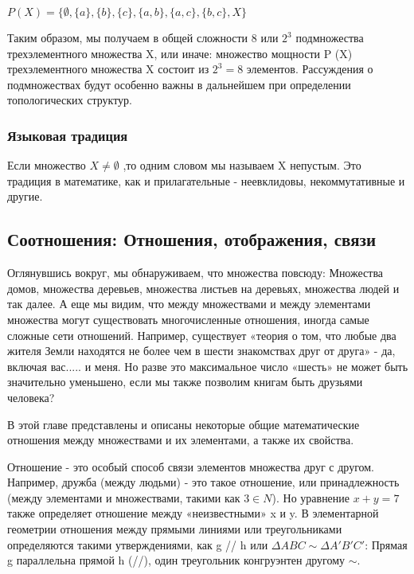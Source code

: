 \vspace{0.5cm}
\(P(X)=\{\emptyset, \{a\}, \{b\},\{c\},\{a,b\},\{a,c\},\{b,c\}, X\}\)

\vspace{0.5cm}

Таким образом, мы получаем в общей сложности 8 или \(2^3\) подмножества трехэлементного множества X, или иначе: множество мощности P (X) трехэлементного множества X состоит из \(2^3 = 8\) элементов. Рассуждения о подмножествах будут особенно важны в дальнейшем при определении топологических структур.

\subsubsection{Языковая традиция}
Если множество \(X \neq \emptyset\) ,то одним словом мы называем X непустым. Это традиция в математике, как и прилагательные - неевклидовы, некоммутативные и другие.
\pagebreak

\subsection{Соотношения: Отношения, отображения, связи}
Оглянувшись вокруг, мы обнаруживаем, что  множества повсюду: Множества домов, множества деревьев, множества листьев на деревьях, множества людей и так далее. А еще мы видим, что между множествами и между элементами множества могут существовать многочисленные отношения, иногда самые сложные сети отношений. Например, существует «теория о том, что любые два жителя Земли находятся не более чем в шести знакомствах друг от друга» - да, включая вас..... и меня. Но разве это максимальное число «шесть» не может быть значительно уменьшено, если мы также позволим книгам быть друзьями человека?

В этой главе представлены и описаны некоторые общие математические отношения между множествами и их элементами, а также их свойства.

Отношение - это особый способ связи элементов множества друг с другом. Например, дружба (между людьми) - это такое отношение, или принадлежность (между элементами и множествами, такими как \(3 \in N\)).
Но уравнение \(x + y =7\) также определяет отношение между «неизвестными» x и y.
В элементарной геометрии отношения между прямыми линиями или треугольниками определяются такими утверждениями, как g // h или \(\Delta ABC \sim \Delta A'B'C'\): Прямая g параллельна прямой h (//), один треугольник конгруэнтен другому \(\sim\).

